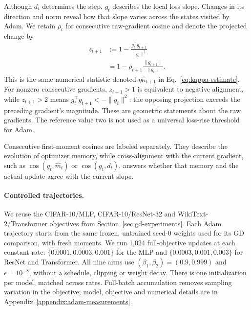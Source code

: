 Although $d_t$ determines the step, $g_t$ describes the local loss slope.
Changes in its direction and norm reveal how that slope varies across
the states visited by Adam. We retain $\rho_t$ for consecutive raw-gradient
cosine and denote the projected change by
\begin{equation}
\begin{aligned}
z_{t+1}
&:=1-\frac{g_t^\top g_{t+1}}{\|g_t\|^2}\\
&=1-\rho_{t+1}\frac{\|g_{t+1}\|}{\|g_t\|}.
\end{aligned}
\label{eq:adam-projected-response}
\end{equation}
This is the same numerical statistic denoted
$\eta\widehat\kappa_{t+1}$ in Eq.~\eqref{eq:kappa-estimate}.
For nonzero consecutive gradients, $z_{t+1}>1$ is equivalent to negative
alignment, while $z_{t+1}>2$ means
$g_t^\top g_{t+1}<-\|g_t\|^2$: the opposing projection exceeds the preceding
gradient's magnitude. These are geometric statements about the raw
gradients. The reference value two is not used as a universal loss-rise
threshold for Adam.

Consecutive first-moment cosines are labeled separately. They describe
the evolution of optimizer memory, while cross-alignment with the current
gradient, such as $\cos(g_t,\widehat m_t)$ or $\cos(g_t,d_t)$, answers
whether that memory and the actual update agree with the current slope.

\paragraph{Controlled trajectories.}


We reuse the CIFAR-10/MLP, CIFAR-10/ResNet-32 and WikiText-2/Transformer
objectives from Section~\ref{sec:gd-experiments}. Each Adam trajectory starts
from the same frozen, untrained seed-0 weights used for its GD comparison,
with fresh moments. We run 1,024 full-objective updates at each constant
rate: $\{0.0001,0.0003,0.001\}$ for the MLP and
$\{0.0003,0.001,0.003\}$ for ResNet and Transformer. All nine arms use
$(\beta_1,\beta_2)=(0.9,0.999)$ and $\epsilon=10^{-8}$, without a schedule,
clipping or weight decay. There is one initialization per model, matched
across rates. Full-batch accumulation removes sampling variation in the
objective; model, objective and numerical details are in
Appendix~\ref{appendix:adam-measurements}.



